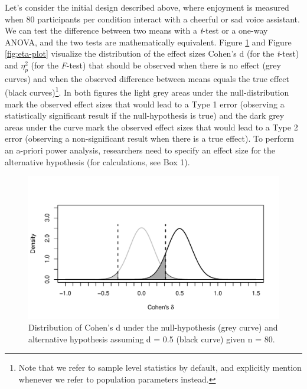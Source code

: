 \documentclass[
  ,man,floatsintext]{apa6}
\begin{document}
Let's consider the initial design described above, where enjoyment is measured when 80 participants per condition interact with a cheerful or sad voice assistant.
We can test the difference between two means with a \emph{t}-test or a one-way ANOVA, and the two tests are mathematically equivalent.
Figure \ref{fig:d-plot} and Figure \ref{fig:eta-plot} visualize the distribution of the effect sizes Cohen's d (for the \emph{t}-test) and \(\eta_p^2\) (for the \emph{F}-test) that should be observed when there is no effect (grey curves) and when the observed difference between means equals the true effect (black curves)\footnote{Note that we refer to sample level statistics by default, and explicitly mention whenever we refer to population parameters instead.}.
In both figures the light grey areas under the null-distribution mark the observed effect sizes that would lead to a Type 1 error (observing a statistically significant result if the null-hypothesis is true) and the dark grey areas under the curve mark the observed effect sizes that would lead to a Type 2 error (observing a non-significant result when there is a true effect).
To perform an a-priori power analysis, researchers need to specify an effect size for the alternative hypothesis (for calculations, see Box 1).

\begin{figure}
\centering
\includegraphics{0.1_Simulation_Based_Power_Analysis_For_Factorial_ANOVA_Designs_files/figure-latex/d-plot-1.pdf}
\caption{\label{fig:d-plot}Distribution of Cohen's d under the null-hypothesis (grey curve) and alternative hypothesis assuming d = 0.5 (black curve) given n = 80.}
\end{figure}
\end{document}
